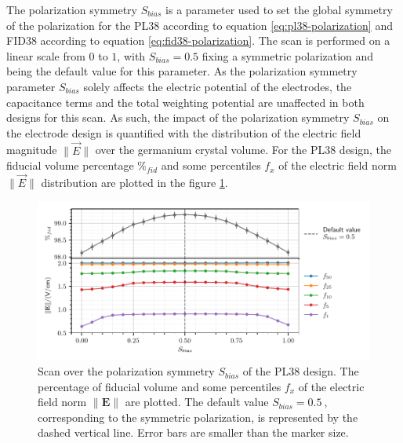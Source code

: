 The polarization symmetry $S_{bias}$ is a parameter used to set the global symmetry of the polarization for the PL38 according to equation \ref{eq:pl38-polarization} and FID38 according to equation \ref{eq:fid38-polarization}. The scan is performed on a linear scale from $0$ to $1$, with $S_{bias}=0.5$ fixing a symmetric polarization and being the default value for this parameter. 
As the polarization symmetry parameter $S_{bias}$ solely affects the electric potential of the electrodes, the capacitance terms and the total weighting potential are unaffected in both designs for this scan. As such, the impact of the polarization symmetry $S_{bias}$ on the electrode design is quantified with the distribution of the electric field magnitude $\| \vec{E} \|$ over the germanium crystal volume.
For the PL38 design, the fiducial volume percentage $\%_{fid}$ and some percentiles $f_x$ of the electric field norm $\| \vec{E} \|$ distribution are plotted in the figure \ref{fig:capacitance-fiducial-V-symmetry-pl38}.

\begin{figure}
\centering
\includegraphics[scale=1]{Figures/ElectrodesScan/capacitance_fiducial_V_symmetry_pl38.pdf}
\caption{Scan over the polarization symmetry $S_{bias}$ of the PL38 design. The percentage of fiducial volume and some percentiles $f_x$ of the electric field norm $\| \mathbf{E} \|$ are plotted. The default value $S_{bias}=\SI{0.5}{}$, corresponding to the symmetric polarization, is represented by the dashed vertical line. Error bars are smaller than the marker size.}
\label{fig:capacitance-fiducial-V-symmetry-pl38}
\end{figure}

